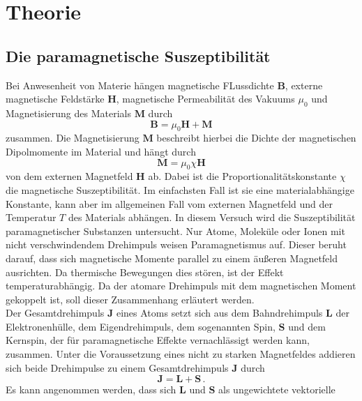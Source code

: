 \section{Theorie}
\label{sec:Theorie}

\subsection{Die paramagnetische Suszeptibilität}
\label{subsec:theoriesuszeptibilitaet}
Bei Anwesenheit von Materie hängen magnetische FLussdichte $\symbf{B}$, externe
magnetische Feldstärke $\symbf{H}$, magnetische Permeabilität des Vakuums $\mu_0$
und Magnetisierung des Materials $\symbf{M}$ durch
\begin{equation}
  \symbf{B} = \mu_0 \symbf{H} + \symbf{M}
  \label{eqn:bhm}
\end{equation}
zusammen. Die Magnetisierung $\symbf{M}$ beschreibt hierbei die Dichte der
magnetischen Dipolmomente im Material und hängt durch
\begin{equation}
  \symbf{M} = \mu_0 \chi \symbf{H}
  \label{eqn:mchih}
\end{equation}
von dem externen Magnetfeld $\symbf{H}$ ab. Dabei ist die Proportionalitätskonstante
$\chi$ die magnetische Suszeptibilität. Im einfachsten Fall ist sie eine materialabhängige
Konstante, kann aber im allgemeinen Fall vom externen Magnetfeld und der Temperatur $T$
des Materials abhängen.
In diesem Versuch wird die Suszeptibilität paramagnetischer Substanzen untersucht.
Nur Atome, Moleküle oder Ionen mit nicht verschwindendem Drehimpuls weisen
Paramagnetismus auf. Dieser beruht darauf, dass sich magnetische Momente parallel zu
einem äußeren Magnetfeld ausrichten. Da thermische Bewegungen dies stören, ist der Effekt
temperaturabhängig. Da der atomare Drehimpuls mit dem magnetischen Moment gekoppelt ist,
soll dieser Zusammenhang erläutert werden. \\
Der Gesamtdrehimpuls $\symbf{J}$ eines Atoms setzt sich aus dem Bahndrehimpuls
$\symbf{L}$ der Elektronenhülle, dem Eigendrehimpuls, dem sogenannten Spin, $\symbf{S}$
und dem Kernspin, der für paramagnetische Effekte vernachlässigt werden kann, zusammen.
Unter die Voraussetzung eines nicht zu starken Magnetfeldes addieren sich beide
Drehimpulse zu einem Gesamtdrehimpuls $\symbf{J}$ durch
\begin{equation}
  \symbf{J} = \symbf{L} + \symbf{S}\,.
  \label{eqn:ls}
\end{equation}
Es kann angenommen werden, dass sich $\symbf{L}$ und $\symbf{S}$ als ungewichtete vektorielle
